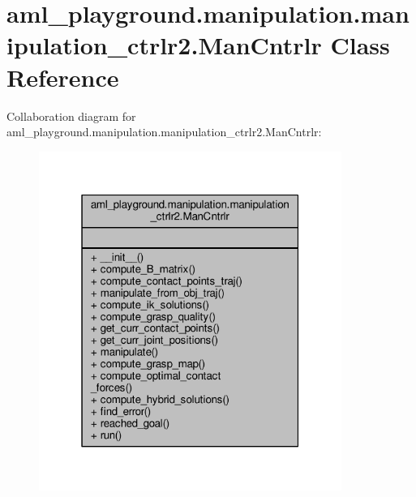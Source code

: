 \hypertarget{classaml__playground_1_1manipulation_1_1manipulation__ctrlr2_1_1_man_cntrlr}{\section{aml\-\_\-playground.\-manipulation.\-manipulation\-\_\-ctrlr2.\-Man\-Cntrlr Class Reference}
\label{classaml__playground_1_1manipulation_1_1manipulation__ctrlr2_1_1_man_cntrlr}
}


Collaboration diagram for aml\-\_\-playground.\-manipulation.\-manipulation\-\_\-ctrlr2.\-Man\-Cntrlr\-:
\nopagebreak
\begin{figure}[H]
\begin{center}
\leavevmode
\includegraphics[width=280pt]{classaml__playground_1_1manipulation_1_1manipulation__ctrlr2_1_1_man_cntrlr__coll__graph}
\end{center}
\end{figure}
